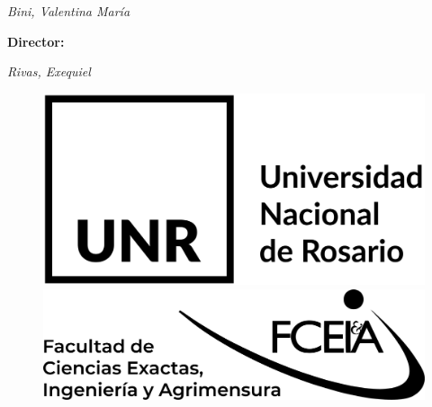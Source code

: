 \begin{titlepage}
    {\itshape\LARGE Bini, Valentina María}
	
	
	
	\vspace{2\baselineskip} %

        \Large{\textbf{Director:}}
	
	
    {\itshape\LARGE Rivas, Exequiel}

	\vspace*{7\baselineskip} %
    
    \begin{figure}[h] %
	\centering
	\includegraphics[height=4\baselineskip]{img/UNR.png} \hfill \includegraphics[height=3.7\baselineskip]{img/FCEIA.png} 
	\end{figure}
    
    \vfill %
	
		
	\vspace{0.2\baselineskip} %
	
	

\end{titlepage}

